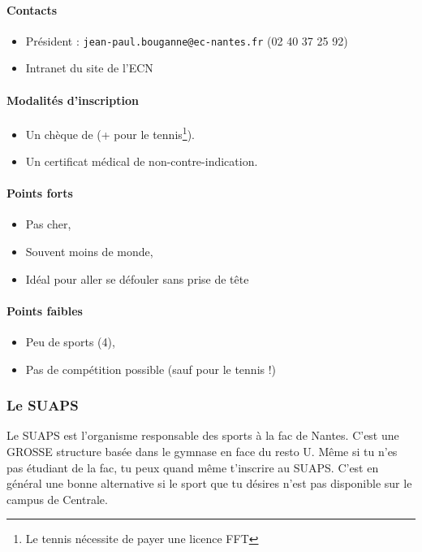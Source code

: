\paragraph{Contacts}
\begin{itemize}
  \item Président : \texttt{jean-paul.bouganne@ec-nantes.fr} (02 40 37 25 92)
  \item Intranet du site de l'ECN
\end{itemize}
\paragraph{Modalités d'inscription}
\begin{itemize}
  \item Un chèque de  (+  pour le tennis\footnote{Le tennis nécessite de payer une licence FFT}).
  \item Un certificat médical de non-contre-indication.
\end{itemize}

\paragraph{Points forts}
\begin{itemize}
  \item Pas cher,
  \item Souvent moins de monde,
  \item Idéal pour aller se défouler sans prise de tête
\end{itemize}
\paragraph{Points faibles}
\begin{itemize}
  \item Peu de sports (4),
  \item Pas de compétition possible (sauf pour le tennis !)
\end{itemize}

\subsubsection{Le SUAPS}
Le SUAPS est l'organisme responsable des sports à la fac de Nantes.
C'est une GROSSE structure basée dans le gymnase en face du resto U.
Même si tu n'es pas étudiant de la fac, tu peux quand même t'inscrire au SUAPS.
C'est en général une bonne alternative si le sport que tu désires n'est pas disponible sur le campus de Centrale.

